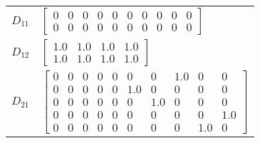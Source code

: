 \begin{tabular}{cl}
 $D_{11}$ & $\left[\begin{matrix}0 & 0 & 0 & 0 & 0 & 0 & 0 & 0 & 0 & 0\\0 & 0 & 0 & 0 & 0 & 0 & 0 & 0 & 0 & 0\end{matrix}\right]$                                                                                                                                                                                                                                                                                                                                                                                                                                                                                               \\
 $D_{12}$ & $\left[\begin{matrix}1.0 & 1.0 & 1.0 & 1.0\\1.0 & 1.0 & 1.0 & 1.0\end{matrix}\right]$                                                                                                                                                                                                                                                                                                                                                                                                                                                                                                                               \\
 $D_{21}$ & $\left[\begin{matrix}0 & 0 & 0 & 0 & 0 & 0 & 0 & 1.0 & 0 & 0\\0 & 0 & 0 & 0 & 0 & 1.0 & 0 & 0 & 0 & 0\\0 & 0 & 0 & 0 & 0 & 0 & 1.0 & 0 & 0 & 0\\0 & 0 & 0 & 0 & 0 & 0 & 0 & 0 & 0 & 1.0\\0 & 0 & 0 & 0 & 0 & 0 & 0 & 0 & 1.0 & 0\end{matrix}\right]$                                                                                                                                                                                                                                                                                                                                                                \\
\hline
\end{tabular}